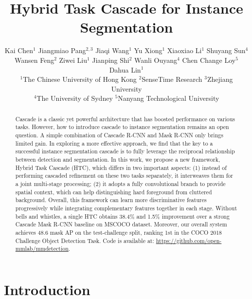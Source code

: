 \documentclass[10pt,twocolumn,letterpaper]{article}
\begin{document}
\title{Hybrid Task Cascade for Instance Segmentation}

\author{Kai Chen$^1$ \quad Jiangmiao Pang$^{2,3}$ \quad Jiaqi Wang$^1$ \quad Yu Xiong$^1$ \quad Xiaoxiao Li$^1$ \quad Shuyang Sun$^4$\\
Wansen Feng$^2$ \quad Ziwei Liu$^1$ \quad Jianping Shi$^2$ \quad Wanli Ouyang$^4$ \quad Chen Change Loy$^5$ \quad Dahua Lin$^1$\\
$^1$The Chinese University of Hong Kong \quad $^2$SenseTime Research \quad $^3$Zhejiang University \\
$^4$The University of Sydney \quad $^5$Nanyang Technological University\\
}

\maketitle
\thispagestyle{empty}



\begin{abstract}

Cascade is a classic yet powerful architecture that has boosted performance on
various tasks. However, how to introduce cascade to instance segmentation remains
an open question. A simple combination of Cascade R-CNN and Mask R-CNN
only brings limited gain.
In exploring a more effective approach, we find that the key to a successful
instance segmentation cascade is to fully leverage the reciprocal relationship
between detection and segmentation.
In this work, we propose a new framework, Hybrid Task Cascade (HTC), which
differs in two important aspects:
(1) instead of performing cascaded refinement on these two tasks separately,
it interweaves them for a joint multi-stage processing;
(2) it adopts a fully convolutional branch to provide spatial context, which can
help distinguishing hard foreground from cluttered background.
Overall, this framework can learn more discriminative features
progressively while integrating complementary features together in each stage.
Without bells and whistles, a single HTC obtains
38.4\% and 1.5\% improvement over a strong Cascade Mask R-CNN
baseline on MSCOCO dataset.
Moreover, our overall system achieves 48.6 mask AP on the test-challenge split, ranking 1st in the COCO 2018 Challenge Object Detection Task.
Code is available at: \url{https://github.com/open-mmlab/mmdetection}.

\end{abstract}
 

\section{Introduction}
\label{sec:intro}
\end{document}
